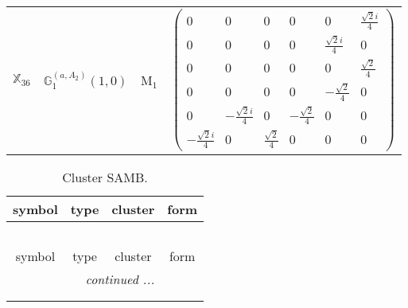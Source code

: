 \documentclass[fleqn,10pt,landscape]{article}
\begin{document}
\begin{itemize}
\begin{center}
\begin{longtable}{c|c|c|c}
$ \mathbb{X}_{36} $ & $\mathbb{G}_{1}^{(a,A_{2})}(1,0)$ & M$_{1}$ & $\begin{pmatrix} 0 & 0 & 0 & 0 & 0 & \frac{\sqrt{2} i}{4} \\ 0 & 0 & 0 & 0 & \frac{\sqrt{2} i}{4} & 0 \\ 0 & 0 & 0 & 0 & 0 & \frac{\sqrt{2}}{4} \\ 0 & 0 & 0 & 0 & - \frac{\sqrt{2}}{4} & 0 \\ 0 & - \frac{\sqrt{2} i}{4} & 0 & - \frac{\sqrt{2}}{4} & 0 & 0 \\ - \frac{\sqrt{2} i}{4} & 0 & \frac{\sqrt{2}}{4} & 0 & 0 & 0 \end{pmatrix}$ \\
\end{longtable}
\end{center}
\begin{center}
\renewcommand{\arraystretch}{1.3}
\begin{longtable}{c|c|c|c}
\caption{Cluster SAMB.}
 \\
 \hline \hline
symbol & type & cluster & form \\ \hline \endfirsthead

\multicolumn{3}{l}{\tablename\ \thetable{}} \\
 \hline \hline
symbol & type & cluster & form \\ \hline \endhead

 \hline \hline
\multicolumn{3}{r}{\footnotesize\it continued ...} \\ \endfoot

 \hline \hline
\multicolumn{3}{r}{} \\ \endlastfoot


\end{longtable}
\end{center}
\end{itemize}
\end{document}
